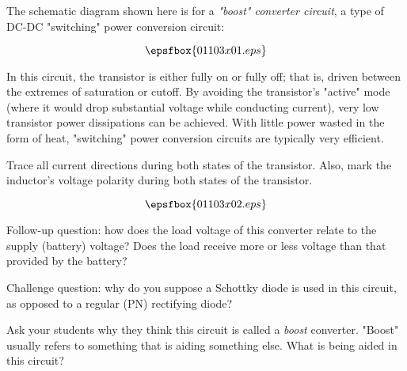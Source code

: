 

The schematic diagram shown here is for a {\it "boost" converter circuit}, a type of DC-DC "switching" power conversion circuit:

$$\epsfbox{01103x01.eps}$$

In this circuit, the transistor is either fully on or fully off; that is, driven between the extremes of saturation or cutoff.  By avoiding the transistor's "active" mode (where it would drop substantial voltage while conducting current), very low transistor power dissipations can be achieved.  With little power wasted in the form of heat, "switching" power conversion circuits are typically very efficient.

Trace all current directions during both states of the transistor.  Also, mark the inductor's voltage polarity during both states of the transistor.







$$\epsfbox{01103x02.eps}$$

\vskip 10pt

Follow-up question: how does the load voltage of this converter relate to the supply (battery) voltage?  Does the load receive more or less voltage than that provided by the battery?

\vskip 10pt

Challenge question: why do you suppose a Schottky diode is used in this circuit, as opposed to a regular (PN) rectifying diode?







Ask your students why they think this circuit is called a {\it boost} converter.  "Boost" usually refers to something that is aiding something else.  What is being aided in this circuit?





